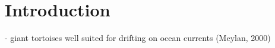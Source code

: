 \section{Introduction}



- giant tortoises well suited for drifting on ocean currents (Meylan, 2000)